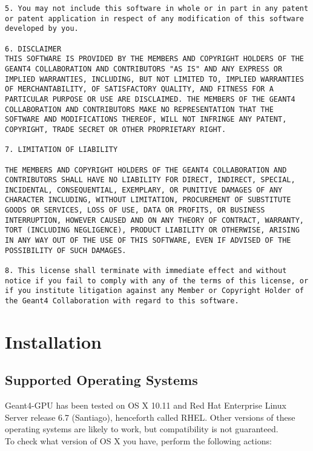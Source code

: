 \documentclass[12pt]{article}
\begin{document}
\begin{lstlisting}
5. You may not include this software in whole or in part in any patent or patent application in respect of any modification of this software developed by you.

6. DISCLAIMER
THIS SOFTWARE IS PROVIDED BY THE MEMBERS AND COPYRIGHT HOLDERS OF THE GEANT4 COLLABORATION AND CONTRIBUTORS "AS IS" AND ANY EXPRESS OR IMPLIED WARRANTIES, INCLUDING, BUT NOT LIMITED TO, IMPLIED WARRANTIES OF MERCHANTABILITY, OF SATISFACTORY QUALITY, AND FITNESS FOR A PARTICULAR PURPOSE OR USE ARE DISCLAIMED. THE MEMBERS OF THE GEANT4 COLLABORATION AND CONTRIBUTORS MAKE NO REPRESENTATION THAT THE SOFTWARE AND MODIFICATIONS THEREOF, WILL NOT INFRINGE ANY PATENT, COPYRIGHT, TRADE SECRET OR OTHER PROPRIETARY RIGHT.

7. LIMITATION OF LIABILITY

THE MEMBERS AND COPYRIGHT HOLDERS OF THE GEANT4 COLLABORATION AND CONTRIBUTORS SHALL HAVE NO LIABILITY FOR DIRECT, INDIRECT, SPECIAL, INCIDENTAL, CONSEQUENTIAL, EXEMPLARY, OR PUNITIVE DAMAGES OF ANY CHARACTER INCLUDING, WITHOUT LIMITATION, PROCUREMENT OF SUBSTITUTE GOODS OR SERVICES, LOSS OF USE, DATA OR PROFITS, OR BUSINESS INTERRUPTION, HOWEVER CAUSED AND ON ANY THEORY OF CONTRACT, WARRANTY, TORT (INCLUDING NEGLIGENCE), PRODUCT LIABILITY OR OTHERWISE, ARISING IN ANY WAY OUT OF THE USE OF THIS SOFTWARE, EVEN IF ADVISED OF THE POSSIBILITY OF SUCH DAMAGES.

8. This license shall terminate with immediate effect and without notice if you fail to comply with any of the terms of this license, or if you institute litigation against any Member or Copyright Holder of the Geant4 Collaboration with regard to this software.
\end{lstlisting}
 
\section{Installation} %

\subsection{Supported Operating Systems} %
Geant4-GPU has been tested on OS X 10.11 and Red Hat Enterprise Linux Server release 6.7 (Santiago), henceforth called RHEL. Other versions of these operating systems are likely to work, but compatibility is not guaranteed.\\

To check what version of OS X you have, perform the following actions:
\end{document}
